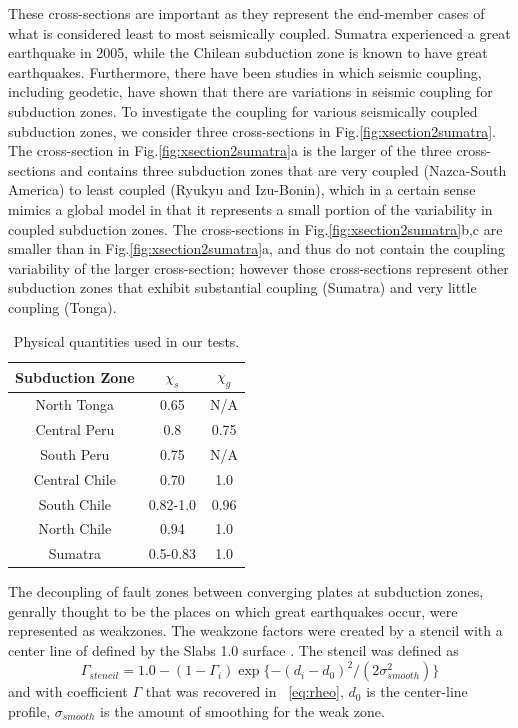 \documentclass[12pt]{article}
\begin{document}
These cross-sections are important as they represent the end-member cases of what is considered least to most seismically coupled. Sumatra experienced a great earthquake in 2005, while the Chilean subduction zone is known to have great earthquakes. Furthermore, there have been studies in which seismic coupling, including geodetic, have shown that there are variations in seismic coupling for subduction zones. To investigate the coupling for various seismically coupled subduction zones, we consider three cross-sections in Fig.\ref{fig:xsection2sumatra}. The cross-section in Fig.\ref{fig:xsection2sumatra}a is the larger of the three cross-sections and contains three subduction zones that are very coupled (Nazca-South America) to least coupled (Ryukyu and Izu-Bonin), which in a certain sense mimics a global model in that it represents a small portion of the variability in coupled subduction zones. The cross-sections in Fig.\ref{fig:xsection2sumatra}b,c are smaller than in  Fig.\ref{fig:xsection2sumatra}a, and thus do not contain the coupling variability of the larger cross-section; however those cross-sections represent other subduction zones that exhibit substantial coupling (Sumatra) and very little coupling (Tonga).

\begin{table}[H]
  \caption{Physical quantities used in our tests.} %
  \centering  %
  \begin{tabular}{c c c} %
    \hline \hline                        %
    Subduction Zone & $\chi_s$ & $\chi_g$  \\ [0.5ex] %
    \hline                  %
    North Tonga  &0.65 &N/A   \\
    Central Peru &0.8 &0.75 \\
    South Peru &0.75 &N/A \\
    Central Chile &0.70 &1.0 \\
    South Chile  &0.82-1.0 &0.96 \\
    North Chile &0.94 &1.0 \\
    Sumatra &0.5-0.83 &1.0 \\
    \hline %
  \end{tabular}
  \label{table:parameters} %
\end{table}


The decoupling of fault zones between converging plates at subduction zones, genrally thought to be the places on which great earthquakes occur, were represented as weakzones. The weakzone factors were created by a stencil with a center line of defined by the Slabs 1.0 surface \citep{Hayes2012}. The stencil was defined as
\begin{equation}
\Gamma_{stencil} = 1.0 - (1-\Gamma_i)\exp\{-(d_i-d_0)^2/(2\sigma_{smooth}^2)\}
\end{equation}
and with coefficient $\Gamma$ that was recovered in ~\eqref{eq:rheo}, $d_0$ is the center-line profile, $\sigma_{smooth}$ is the amount of smoothing for the weak zone.
\end{document}
